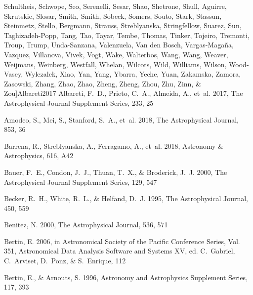 \documentclass[apj, revtex4-1]{emulateapj}
\begin{document}
\begin{thebibliography}{}
{  Schultheis, Schwope, Seo, Serenelli, Sesar, Shao, Shetrone, Shull, Aguirre,
  Skrutskie, Slosar, Smith, Smith, Sobeck, Somers, Souto, Stark, Stassun,
  Steinmetz, Stello, Bergmann, Strauss, Streblyanska, Stringfellow, Suarez,
  Sun, Taghizadeh-Popp, Tang, Tao, Tayar, Tembe, Thomas, Tinker, Tojeiro,
  Tremonti, Troup, Trump, Unda-Sanzana, Valenzuela, {Van den Bosch},
  Vargas-Maga{\~{n}}a, Vazquez, Villanova, Vivek, Vogt, Wake, Walterbos, Wang,
  Wang, Weaver, Weijmans, Weinberg, Westfall, Whelan, Wilcots, Wild, Williams,
  Wilson, Wood-Vasey, Wylezalek, Xiao, Yan, Yang, Ybarra, Yeche, Yuan,
  Zakamska, Zamora, Zasowski, Zhang, Zhao, Zhao, Zheng, Zheng, Zhou, Zhu, Zinn,
  \& Zou}]{Albareti2017}
Albareti, F.~D., Prieto, C.~A., Almeida, A., {et~al.} 2017, The Astrophysical
  Journal Supplement Series, 233, 25

Amodeo, S., Mei, S., Stanford, S.~A., {et~al.} 2018, The Astrophysical Journal,
  853, 36

Barrena, R., Streblyanska, A., Ferragamo, A., {et~al.} 2018, Astronomy {\&}
  Astrophysics, 616, A42

Bauer, F.~E., Condon, J.~J., Thuan, T.~X., \& Broderick, J.~J. 2000, The
  Astrophysical Journal Supplement Series, 129, 547

Becker, R.~H., White, R.~L., \& Helfand, D.~J. 1995, The Astrophysical Journal,
  450, 559

Benitez, N. 2000, The Astrophysical Journal, 536, 571

Bertin, E. 2006, in Astronomical Society of the Pacific Conference Series, Vol.
  351, Astronomical Data Analysis Software and Systems XV, ed. C.~Gabriel,
  C.~Arviset, D.~Ponz, \& S.~Enrique, 112

Bertin, E., \& Arnouts, S. 1996, Astronomy and Astrophysics Supplement Series,
  117, 393


\end{thebibliography}
\end{document}
